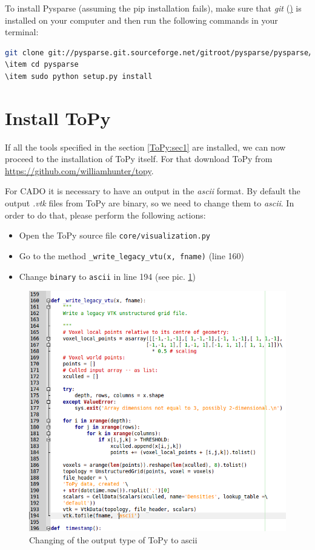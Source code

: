 \documentclass[11pt,a4paper,article,bibtotoc,idxtotoc,headsepline,footsepline,footexclude,DIV13,oneside]{scrbook}
\begin{document}
	To install Pysparse (assuming the pip installation fails), make sure that \textit{git} (\href{https://git-scm.com/}) is installed on your computer and then run the following commands in your terminal:
\begin{lstlisting}[language=bash]
git clone git://pysparse.git.sourceforge.net/gitroot/pysparse/pysparse/
\item cd pysparse
\item sudo python setup.py install	
\end{lstlisting}	
	
	\section{Install ToPy}
	If all the tools specified in the section \ref{ToPy:sec1} are installed, we can now proceed to the installation of ToPy itself. For that download ToPy from \href{https://github.com/williamhunter/topy}{https://github.com/williamhunter/topy}. 

For CADO it is necessary to have an output in the \textit{ascii} format. By default the output \textit{.vtk} files from ToPy are binary, so we need to change them to \textit{ascii}. In order to do that, please perform the following actions:
	\begin{itemize}
 		\item Open the ToPy source file \texttt{core/visualization.py}
 		\item Go to the method \texttt{{\_}write{\_}legacy{\_}vtu(x, fname)} (line 160)
 		\item Change \texttt{binary} to \texttt{ascii} in line 194 (see pic. \ref{fig:ToPy_CodeChange})
	\end{itemize} 
	\begin{figure}
	\centering
	\includegraphics[scale=0.5]{img/ToPy_CodeChange.png}
	\caption{Changing of the output type of ToPy to ascii}
	\label{fig:ToPy_CodeChange}
	\end{figure}
\end{document}

